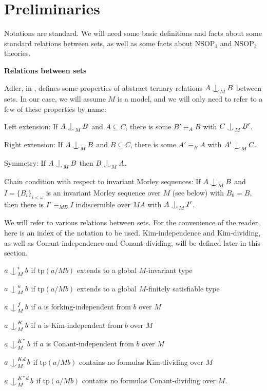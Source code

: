 \documentclass[12pt]{amsart}
\theoremstyle{definition}
\def\Ind#1#2{#1\setbox0=\hbox{$#1x$}\kern\wd0\hbox to 0pt{\hss$#1\mid$\hss}
\lower.9\ht0\hbox to 0pt{\hss$#1\smile$\hss}\kern\wd0}
\def\ind{\mathop{\mathpalette\Ind{}}}
\begin{document}
\section{Preliminaries}

Notations are standard. We will need some basic definitions and facts about some standard relations between sets, as well as some facts about $\mathrm{NSOP}_{1}$ and $\mathrm{NSOP}_{3}$ theories.

\textbf{Relations between sets}

Adler, in \cite{A09}, defines some properties of abstract ternary relations $A \ind_{M} B$ between sets. In our case, we will assume $M$ is a model, and we will only need to refer to a few of these properties by name:


Left extension: If $A\ind_{M} B $ and $A \subseteq C$, there is some $B' \equiv_{A} B$ with  $C\ind_{M} B' $.

Right extension: If $A\ind_{M} B $ and $B \subseteq C$, there is some $A' \equiv_{B} A$ with  $A'\ind_{M} C $.

Symmetry: If $A \ind_{M} B$ then $B \ind_{M} A$.

Chain condition with respect to invariant Morley sequences: If $A \ind_{M} B$ and $I = \{B_{i}\}_{i < \omega}$ is an invariant Morley sequence over $M$ (see below) with $B_{0} = B$, then there is $I' \equiv_{MB} I$ indiscernible over $MA$ with $A \ind_{M} I'$.

We will refer to various relations between sets. For the convenience of the reader, here is an index of the notation to be used. Kim-independence and Kim-dividing, as well as Conant-independence and Conant-dividing, will be defined later in this section.

$a \ind_{M}^{i} b$ if $\mathrm{tp}(a/Mb)$ extends to a global $M$-invariant type

$a \ind^{u}_{M} b$ if $\mathrm{tp}(a/Mb)$ extends to a global $M$-finitely satisfiable type

$a \ind^{f}_{M} b$ if $a$ is forking-independent from $b$ over $M$

$a \ind^{K}_{M} b$ if $a$ is Kim-independent from $b$ over $M$

$a \ind^{K^{*}}_{M} b$ if $a$ is Conant-independent from $b$ over $M$

$a \ind^{Kd}_{M} b$ if $\mathrm{tp}(a/Mb)$ contains no formulas Kim-dividing over $M$

$a \ind^{K^{*}d}_{M} b$ if $\mathrm{tp}(a/Mb)$ contains no formulas Conant-dividing over $M$.
\end{document}
